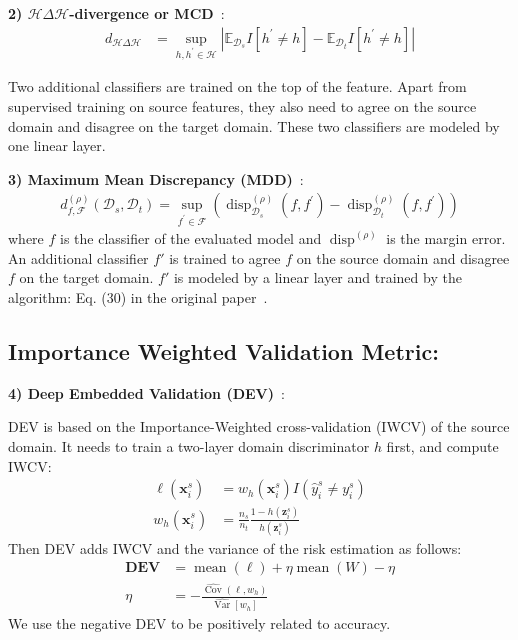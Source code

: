 \textbf{2) $\mathcal{H} \Delta \mathcal{H}$-divergence or MCD}~\cite{BenDavidH,MCD}:
\begin{align}
    d_{\mathcal{H} \Delta \mathcal{H}}&=\sup _{h, h^{\prime} \in \mathcal{H}}\left|\mathbb{E}_{\mathcal{D}_s} I\left[h^{\prime} \neq h\right]-\mathbb{E}_{\mathcal{D}_t} I\left[h^{\prime} \neq h\right]\right|\nonumber
\end{align}

Two additional classifiers are trained on the top of the feature. Apart from supervised training on source features, they also need to agree on the source domain and disagree on the target domain. These two classifiers are modeled by one linear layer. 

\textbf{3) Maximum Mean Discrepancy (MDD)}~\cite{MDD}:
\begin{align}
    d_{f, \mathcal{F}}^{(\rho)}({\mathcal{D}_s}, {\mathcal{D}_t}) = \sup _{f^{\prime}\in\mathcal{F}}\left(\operatorname{disp}_{\mathcal{D}_s}^{(\rho)}\left(f, f^{\prime}\right)-\operatorname{disp}_{\mathcal{D}_t}^{(\rho)}\left(f, f^{\prime}\right)\right)\nonumber
\end{align}
where $f$ is the classifier of the evaluated model and $\operatorname{disp}^{(\rho)}$ is the margin error. An additional classifier $f'$ is trained to agree $f$ on the source domain and disagree $f$ on the target domain. $f'$ is modeled by a linear layer and trained by the algorithm: Eq. (30) in the original paper~\cite{MDD}.

\subsection{Importance Weighted Validation Metric:} 

\textbf{4) Deep Embedded Validation (DEV)}~\cite{DEV}:

DEV is based on the Importance-Weighted cross-validation (IWCV) of the source domain. It needs to train a two-layer domain discriminator $h$ first, and compute IWCV:
\begin{align}
    \ell(\mathbf{x}_i^{s}) &= w_{h}\left(\mathbf{x}_i^{s}\right) I\left(\hat{y}_i^{s}\neq y_i^{s}\right)\nonumber \\
    w_{h}\left(\mathbf{x}_i^{s}\right) &= \frac{n_s}{n_t} \frac{1-h\left(\boldsymbol{z}_i^{s}\right)}{h\left(\boldsymbol{z}_i^{s}\right)}\nonumber
\end{align}
Then DEV adds IWCV and the variance of the risk estimation as follows:
\begin{align}
    \boldsymbol{DEV}&=\operatorname{mean}(\ell)+\eta \operatorname{mean}(W)-\eta \\
    \eta&=-\frac{\widehat{\operatorname{Cov}}\left(\ell, w_h\right)}{\widehat{\operatorname{Var}}\left[w_h\right]}
\end{align}
We use the negative DEV to be positively related to accuracy.

